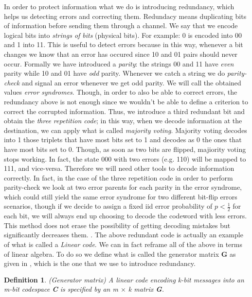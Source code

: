 \documentclass{Configuration_Files/PoliMi3i_thesis}
\newtheorem{definition}{Definition}[chapter]
\begin{document}
In order to protect information what we do is introducing redundancy, which helps us detecting errors and correcting them. Redundacy means duplicating bits of information before sending them through a channel. We say that we encode logical bits into {\it strings of bits} (physical bits). For example: 0 is encoded into 00 and 1 into 11. This is useful to detect errors because in this way, whenever a bit changes we know that an error has occured since 10 and 01 pairs should never occur. Formally we have introduced a {\it parity}: the strings 00 and 11 have {\it even} parity while 10 and 01 have {\it odd} parity. Whenever we catch a string we do {\it parity-check} and signal an error whenever we get odd parity. We will call the obtained values {\it error syndromes}.
Though, in order to also be able to correct errors, the redundancy above is not enough since we wouldn't be able to define a criterion to correct the corrupted information. Thus, we introduce a third redundant bit and obtain the {\it three repetition code}; in this way, when we decode information at the destination, we can apply what is called {\it majority voting}. Majority voting decodes into 1 those triplets that have most bits set to 1 and decodes as 0 the ones that have most bits set to 0. Though, as soon as two bits are flipped, majiority voting stops working. In fact, the state 000 with two errors (e.g. 110) will be mapped to 111, and vice-versa. Therefore we will need other tools to decode information correctly. In fact, in the case of the three repetition code in order to perform parity-check we look at two error parents for each parity in the error syndrome, which could still yield the same error syndrome for two different bit-flip errors scenarios, though if we decide to assign a fixed iid error probability of $p<\frac{1}{2}$ for each bit, we will always end up choosing to decode the codeword with less errors. This method does not erase the possibility of getting decoding mistakes but significantly decreases them. \cite{Kas19}.\newline
The above redundant code is actually an example of what is called a {\it Linear code}.
We can in fact reframe all of the above in terms of linear algebra. To do so we define what is called the generator matrix  \textbf{G} as given in \cite{Cha06,Kas19}, which is the one that we use to introduce redundancy. 

\begin{definition}(Generator matrix)
	A linear code encoding k-bit messages into an m-bit codespace \textbf{C} is specified by an m $\times$ k matrix {\bf G}.
\end{definition}
\end{document}
